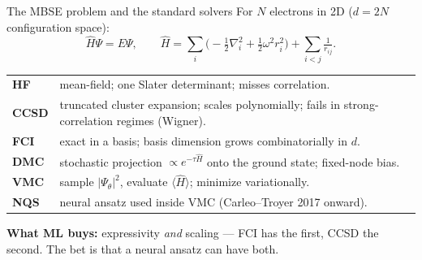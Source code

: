 \documentclass[10pt,aspectratio=169]{beamer}
\newcommand{\paperA}[1]{\textcolor{papA}{\textbf{#1}}}
\newcommand{\ours}[1]{\textcolor{ourwork}{\textbf{#1}}}
\begin{document}
\begin{frame}{The MBSE problem and the standard solvers}
\small
For $N$ electrons in 2D ($d{=}2N$ configuration space):
\[
  \hat H \Psi = E\Psi,\qquad
  \hat H = \sum_i\bigl(-\tfrac12\nabla_i^2 + \tfrac12\omega^2 r_i^2\bigr)
         + \sum_{i<j}\tfrac{1}{r_{ij}}.
\]
\begin{tabular}{@{}ll@{}}
\paperA{HF}    & mean-field; one Slater determinant; misses correlation.\\
\paperA{CCSD}  & truncated cluster expansion; scales polynomially; fails in strong-correlation regimes (Wigner).\\
\paperA{FCI}   & exact in a basis; basis dimension grows combinatorially in $d$.\\
\paperA{DMC}   & stochastic projection $\propto e^{-\tau\hat H}$ onto the ground state; fixed-node bias.\\
\paperA{VMC}   & sample $|\Psi_\theta|^2$, evaluate $\langle\hat H\rangle$; minimize variationally.\\
\paperA{NQS}   & neural ansatz used inside VMC (Carleo--Troyer 2017 onward).
\end{tabular}

\vspace{4pt}
\begin{tcolorbox}[colback=ourwork!8,colframe=ourwork!60,boxsep=2pt]
\small \ours{What ML buys:} expressivity \emph{and} scaling --- FCI has the first, CCSD the second.
The bet is that a neural ansatz can have both.
\end{tcolorbox}
\end{frame}
\end{document}
